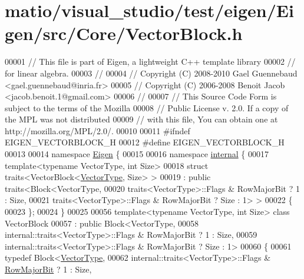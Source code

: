 \hypertarget{matio_2visual__studio_2test_2eigen_2_eigen_2src_2_core_2_vector_block_8h_source}{}\section{matio/visual\+\_\+studio/test/eigen/\+Eigen/src/\+Core/\+Vector\+Block.h}
\label{matio_2visual__studio_2test_2eigen_2_eigen_2src_2_core_2_vector_block_8h_source}

\begin{DoxyCode}
00001 \textcolor{comment}{// This file is part of Eigen, a lightweight C++ template library}
00002 \textcolor{comment}{// for linear algebra.}
00003 \textcolor{comment}{//}
00004 \textcolor{comment}{// Copyright (C) 2008-2010 Gael Guennebaud <gael.guennebaud@inria.fr>}
00005 \textcolor{comment}{// Copyright (C) 2006-2008 Benoit Jacob <jacob.benoit.1@gmail.com>}
00006 \textcolor{comment}{//}
00007 \textcolor{comment}{// This Source Code Form is subject to the terms of the Mozilla}
00008 \textcolor{comment}{// Public License v. 2.0. If a copy of the MPL was not distributed}
00009 \textcolor{comment}{// with this file, You can obtain one at http://mozilla.org/MPL/2.0/.}
00010 
00011 \textcolor{preprocessor}{#ifndef EIGEN\_VECTORBLOCK\_H}
00012 \textcolor{preprocessor}{#define EIGEN\_VECTORBLOCK\_H}
00013 
00014 \textcolor{keyword}{namespace }\hyperlink{namespace_eigen}{Eigen} \{ 
00015 
00016 \textcolor{keyword}{namespace }\hyperlink{namespaceinternal}{internal} \{
00017 \textcolor{keyword}{template}<\textcolor{keyword}{typename} VectorType, \textcolor{keywordtype}{int} Size>
00018 \textcolor{keyword}{struct }traits<VectorBlock<\hyperlink{struct_vector_type}{VectorType}, Size> >
00019   : \textcolor{keyword}{public} traits<Block<VectorType,
00020                      traits<VectorType>::Flags & RowMajorBit ? 1 : Size,
00021                      traits<VectorType>::Flags & RowMajorBit ? Size : 1> >
00022 \{
00023 \};
00024 \}
00025 
00056 \textcolor{keyword}{template}<\textcolor{keyword}{typename} VectorType, \textcolor{keywordtype}{int} Size> \textcolor{keyword}{class }VectorBlock
00057   : \textcolor{keyword}{public} Block<VectorType,
00058                      internal::traits<VectorType>::Flags & RowMajorBit ? 1 : Size,
00059                      internal::traits<VectorType>::Flags & RowMajorBit ? Size : 1>
00060 \{
00061     \textcolor{keyword}{typedef} Block<\hyperlink{struct_vector_type}{VectorType},
00062                      internal::traits<VectorType>::Flags & \hyperlink{group__flags_gae4f56c2a60bbe4bd2e44c5b19cbe8762}{RowMajorBit} ? 1 : Size,

\end{DoxyCode}
